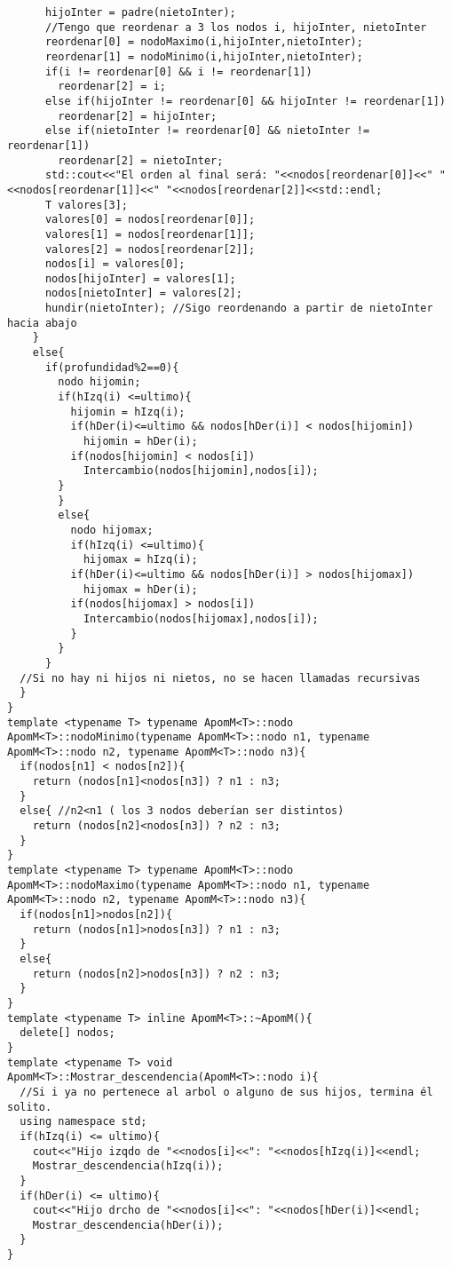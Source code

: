 \begin{verbatim}
      hijoInter = padre(nietoInter);
      //Tengo que reordenar a 3 los nodos i, hijoInter, nietoInter
      reordenar[0] = nodoMaximo(i,hijoInter,nietoInter);
      reordenar[1] = nodoMinimo(i,hijoInter,nietoInter);
      if(i != reordenar[0] && i != reordenar[1])
        reordenar[2] = i;
      else if(hijoInter != reordenar[0] && hijoInter != reordenar[1])
        reordenar[2] = hijoInter;
      else if(nietoInter != reordenar[0] && nietoInter != reordenar[1])
        reordenar[2] = nietoInter;
      std::cout<<"El orden al final será: "<<nodos[reordenar[0]]<<" "<<nodos[reordenar[1]]<<" "<<nodos[reordenar[2]]<<std::endl;
      T valores[3];
      valores[0] = nodos[reordenar[0]];
      valores[1] = nodos[reordenar[1]];
      valores[2] = nodos[reordenar[2]];
      nodos[i] = valores[0];
      nodos[hijoInter] = valores[1];
      nodos[nietoInter] = valores[2];
      hundir(nietoInter); //Sigo reordenando a partir de nietoInter hacia abajo
    }
    else{
      if(profundidad%2==0){
        nodo hijomin;
        if(hIzq(i) <=ultimo){
          hijomin = hIzq(i);
          if(hDer(i)<=ultimo && nodos[hDer(i)] < nodos[hijomin])
            hijomin = hDer(i);
          if(nodos[hijomin] < nodos[i])
            Intercambio(nodos[hijomin],nodos[i]);
        }
        }
        else{
          nodo hijomax;
          if(hIzq(i) <=ultimo){
            hijomax = hIzq(i);
          if(hDer(i)<=ultimo && nodos[hDer(i)] > nodos[hijomax])
            hijomax = hDer(i);
          if(nodos[hijomax] > nodos[i])
            Intercambio(nodos[hijomax],nodos[i]);
          }
        }
      }
  //Si no hay ni hijos ni nietos, no se hacen llamadas recursivas
  }
}
template <typename T> typename ApomM<T>::nodo ApomM<T>::nodoMinimo(typename ApomM<T>::nodo n1, typename ApomM<T>::nodo n2, typename ApomM<T>::nodo n3){
  if(nodos[n1] < nodos[n2]){
    return (nodos[n1]<nodos[n3]) ? n1 : n3;
  }
  else{ //n2<n1 ( los 3 nodos deberían ser distintos)
    return (nodos[n2]<nodos[n3]) ? n2 : n3;
  }
}
template <typename T> typename ApomM<T>::nodo ApomM<T>::nodoMaximo(typename ApomM<T>::nodo n1, typename ApomM<T>::nodo n2, typename ApomM<T>::nodo n3){
  if(nodos[n1]>nodos[n2]){
    return (nodos[n1]>nodos[n3]) ? n1 : n3;
  }
  else{
    return (nodos[n2]>nodos[n3]) ? n2 : n3;
  }
}
template <typename T> inline ApomM<T>::~ApomM(){
  delete[] nodos;
}
template <typename T> void ApomM<T>::Mostrar_descendencia(ApomM<T>::nodo i){
  //Si i ya no pertenece al arbol o alguno de sus hijos, termina él solito.
  using namespace std;
  if(hIzq(i) <= ultimo){
    cout<<"Hijo izqdo de "<<nodos[i]<<": "<<nodos[hIzq(i)]<<endl;
    Mostrar_descendencia(hIzq(i));
  }
  if(hDer(i) <= ultimo){
    cout<<"Hijo drcho de "<<nodos[i]<<": "<<nodos[hDer(i)]<<endl;
    Mostrar_descendencia(hDer(i));
  }
}


\end{verbatim}
